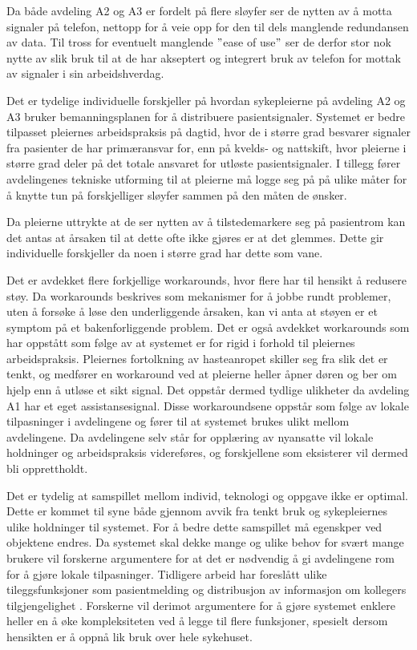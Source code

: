 \noindent
Da både avdeling A2 og A3 er fordelt på flere sløyfer ser de nytten av å motta signaler på telefon, nettopp for å veie opp for den til dels manglende redundansen av data. Til tross for eventuelt manglende $"$ease of use$"$ ser de derfor stor nok nytte av slik bruk til at de har akseptert og integrert bruk av telefon for mottak av signaler i sin arbeidshverdag.

\noindent
Det er tydelige individuelle forskjeller på hvordan sykepleierne på avdeling A2 og A3 bruker bemanningsplanen for å distribuere pasientsignaler. Systemet er bedre tilpasset pleiernes arbeidspraksis på dagtid, hvor de i større grad besvarer signaler fra pasienter de har primæransvar for, enn på kvelds- og nattskift, hvor pleierne i større grad deler på det totale ansvaret for utløste pasientsignaler. I tillegg fører avdelingenes tekniske utforming til at pleierne må logge seg på på ulike måter for å knytte tun på forskjelliger sløyfer sammen på den måten de ønsker. 

\noindent
Da pleierne uttrykte at de ser nytten av å tilstedemarkere seg på pasientrom kan det antas at årsaken til at dette ofte ikke gjøres er at det glemmes. Dette gir individuelle forskjeller da noen i større grad har dette som vane. 

\noindent
Det er avdekket flere forkjellige workarounds, hvor flere har til hensikt å redusere støy. Da workarounds beskrives som mekanismer for å jobbe rundt problemer, uten å forsøke å løse den underliggende årsaken, kan vi anta at støyen er et symptom på et bakenforliggende problem. Det er også avdekket workarounds som har oppstått som følge av at systemet er for rigid i forhold til pleiernes arbeidspraksis.  Pleiernes fortolkning av hasteanropet skiller seg fra slik det er tenkt, og medfører en workaround ved at pleierne heller åpner døren og ber om hjelp enn å utløse et sikt signal. Det oppstår dermed tydlige ulikheter da avdeling A1 har et eget assistansesignal. Disse workaroundsene oppstår som følge av lokale tilpasninger i avdelingene og fører til at systemet brukes ulikt mellom avdelingene. Da avdelingene selv står for opplæring av nyansatte vil lokale holdninger og arbeidspraksis videreføres, og forskjellene som eksisterer vil dermed bli opprettholdt.   

\noindent
Det er tydelig at samspillet mellom individ, teknologi og oppgave ikke er optimal. Dette er kommet til syne både gjennom avvik fra tenkt bruk og sykepleiernes ulike holdninger til systemet. For å bedre dette samspillet må egenskper ved objektene endres. Da systemet skal dekke mange og ulike behov for svært mange brukere vil forskerne argumentere for at det er nødvendig å gi avdelingene rom for å gjøre lokale tilpasninger. Tidligere arbeid har foreslått ulike tileggsfunksjoner som pasientmelding \citep{Rygh13, Selseth12} og distribusjon av informasjon om kollegers tilgjengelighet \citep{Sund13}. Forskerne vil derimot argumentere for å gjøre systemet enklere heller en å øke kompleksiteten ved å legge til flere funksjoner, spesielt dersom hensikten er å oppnå lik bruk over hele sykehuset.